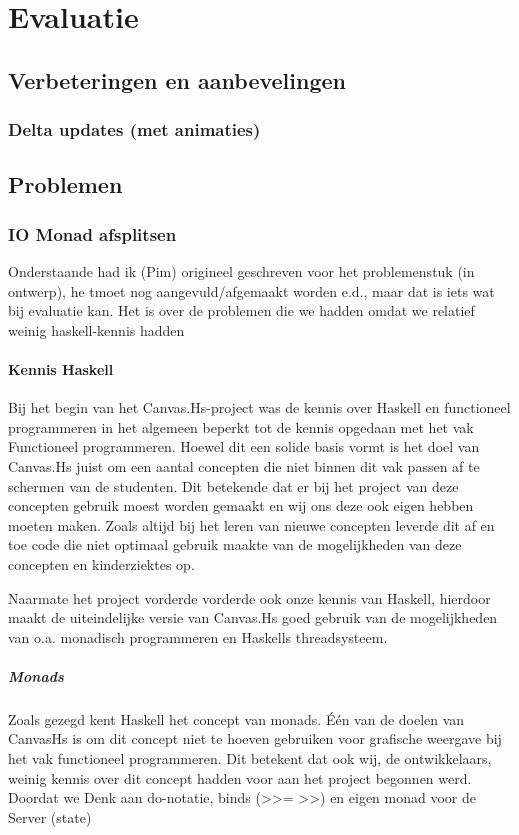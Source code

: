 \chapter{Evaluatie} \label{hoofdstuk:evaluatie}
\section{Verbeteringen en aanbevelingen}
\subsection{Delta updates (met animaties)}

\section{Problemen}
\subsection{IO Monad afsplitsen}

{\color{red} Onderstaande had ik (Pim) origineel geschreven voor het problemenstuk (in ontwerp), he tmoet nog aangevuld/afgemaakt worden e.d., maar dat is iets wat bij evaluatie kan. Het is over de problemen die we hadden omdat we relatief weinig haskell-kennis hadden}

\subsubsection{Kennis Haskell}
Bij het begin van het Canvas.Hs-project was de kennis over Haskell en functioneel programmeren in het algemeen beperkt tot de kennis opgedaan met het vak Functioneel programmeren. Hoewel dit een solide basis vormt is het doel van Canvas.Hs juist om een aantal concepten die niet binnen dit vak passen af te schermen van de studenten. Dit betekende dat er bij het project van deze concepten gebruik moest worden gemaakt en wij ons deze ook eigen hebben moeten maken. Zoals altijd bij het leren van nieuwe concepten leverde dit af en toe code die niet optimaal gebruik maakte van de mogelijkheden van deze concepten en kinderziektes op. 

Naarmate het project vorderde vorderde ook onze kennis van Haskell, hierdoor maakt de uiteindelijke versie van Canvas.Hs goed gebruik van de mogelijkheden van o.a. monadisch programmeren en Haskells threadsysteem. 
\paragraph{Monads}
Zoals gezegd kent Haskell het concept van monads. Één van de doelen van CanvasHs is om dit concept niet te hoeven gebruiken voor grafische weergave bij het vak functioneel programmeren. Dit betekent dat ook wij, de ontwikkelaars, weinig kennis over dit concept hadden voor aan het project begonnen werd. Doordat we 
Denk aan do-notatie, binds (>>=
>>) en eigen monad voor de Server (state)


